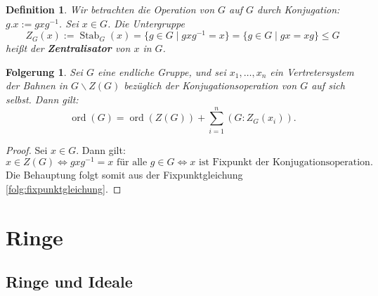 \documentclass[a4paper, twoside, 11pt, ngerman]{report}
\renewcommand{\setminus}{\smallsetminus}
\DeclareMathOperator{\ord}{ord}
\DeclareMathOperator{\Stab}{Stab}
\theoremstyle{definistyle}
\newtheorem{defini}[satz]{Definition}
\newtheorem{folgerung}[satz]{Folgerung}
\theoremstyle{remark}
\newcommand{\defn}[1]{\textit{\bfseries #1}}
\begin{document}
\begin{defini}\label{def:zentralisator}
Wir betrachten die Operation von $G$ auf $G$ durch Konjugation: $g . x := g x g^{-1}$. Sei $x \in G$. Die Untergruppe
\[
Z_G(x) := \Stab_G(x) = \{ g \in G \mid g x g^{-1} = x \} = \{ g\in G \mid gx=xg\} \leq G
\]
heißt der \defn{Zentralisator} von $x$ in $G$.
\end{defini}

\begin{folgerung}\label{folg:zentralisator_gleichung}
Sei $G$ eine endliche Gruppe, und sei $x_1, \dots, x_n$ ein Vertretersystem der Bahnen in $G \setminus Z(G)$ bezüglich der Konjugationsoperation von $G$ auf sich selbst. Dann gilt:
\[
\ord(G) = \ord(Z(G)) + \sum_{i=1}^n (G : Z_G(x_i)).
\]
\end{folgerung}

\begin{proof}
Sei $x\in G$. Dann gilt:
\[x \in Z(G) \iff g x g^{-1} = x \text{ für alle } g \in G \iff x \text{ ist Fixpunkt der Konjugationsoperation.}\]
Die Behauptung folgt somit aus der Fixpunktgleichung \ref{folg:fixpunktgleichung}.
\end{proof}

\chapter{Ringe}
\setcounter{section}{3}
\section{Ringe und Ideale}
\end{document}
